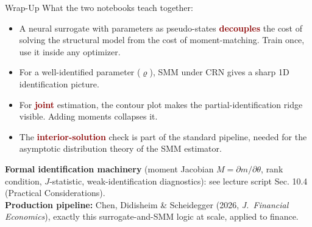 \documentclass[10pt,aspectratio=169]{beamer}
\newcommand{\emphc}[1]{\textbf{\textcolor{darkred}{#1}}}
\begin{document}
\begin{frame}{Wrap-Up}
\small
What the two notebooks teach together:
\begin{itemize}
\itemsep1pt
  \item A neural surrogate with parameters as pseudo-states \emphc{decouples} the cost of solving the structural model from the cost of moment-matching. Train once, use it inside any optimizer.
  \item For a well-identified parameter ($\varrho$), SMM under CRN gives a sharp 1D identification picture.
  \item For \emphc{joint} estimation, the contour plot makes the partial-identification ridge visible. Adding moments collapses it.
  \item The \emphc{interior-solution} check is part of the standard pipeline, needed for the asymptotic distribution theory of the SMM estimator.
\end{itemize}
\vspace{0.10cm}
{\footnotesize \textbf{Formal identification machinery} (moment Jacobian $M = \partial m/\partial\theta$, rank condition, $J$-statistic, weak-identification diagnostics): see lecture script Sec. 10.4 (Practical Considerations).}
\vspace{0.10cm}\\
\textbf{Production pipeline:} Chen, Didisheim \& Scheidegger (2026, \emph{J.\ Financial Economics}), exactly this surrogate-and-SMM logic at scale, applied to finance.
\end{frame}
\end{document}
